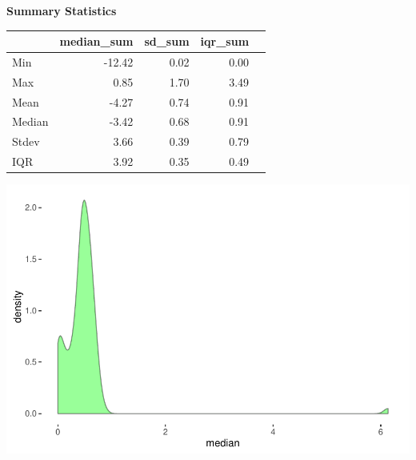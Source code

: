 \documentclass{article}\usepackage[]{graphicx}\usepackage[]{color}
\makeatletter
\def\maxwidth{ %
  \ifdim\Gin@nat@width>\linewidth
    \linewidth
  \else
    \Gin@nat@width
  \fi
}
\makeatother
\begin{document}
\vspace*{1.5cm}
  \raggedright{\color{white!30!black} \textbf{\Large Summary Statistics}}
    \begin{minipage}[c]{0.99\textwidth}  
      \vspace*{0.2cm}
      
\begin{tabular}{lrrrl}
  & median\_sum & sd\_sum & iqr\_sum &  \\ 
  \hline
Min & -12.42 & 0.02 & 0.00 &  \\ 
  Max & 0.85 & 1.70 & 3.49 &  \\ 
  Mean & -4.27 & 0.74 & 0.91 &  \\ 
  Median & -3.42 & 0.68 & 0.91 &  \\ 
  Stdev & 3.66 & 0.39 & 0.79 &  \\ 
  IQR & 3.92 & 0.35 & 0.49 &  \\ 
  \end{tabular}

      \vspace*{0.5cm}
    \end{minipage}
    
    \begin{minipage}[c]{0.99\textwidth}  


{\centering \includegraphics[width=\maxwidth]{figure/plot2-1} 

}



      \vspace*{0.5cm}
    \end{minipage}
\end{document}
